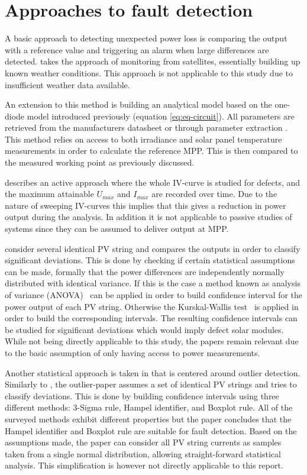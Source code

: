 \clearpage
\section{Approaches to fault detection}
A basic approach to detecting unexpected power loss is comparing the output with a reference value and triggering an alarm when large differences are detected.
\cite{Stettler2005} takes the approach of monitoring from satellites, essentially building up known weather conditions.
This approach is not applicable to this study due to insufficient weather data available.

An extension to this method is building an analytical model \cite{Chouder2010,Raina2013,Chao2008}
based on the one-diode model introduced previously (equation \ref{eq:eq-circuit}).
All parameters are retrieved from the manufacturers datasheet or through parameter extraction \cite{Eicker2005,Chouder2009,Walker2001}.
This method relies on access to both irradiance and solar panel temperature measurements in order to calculate the reference MPP.
This is then compared to the measured working point as previously discussed.

\cite{Meyer2004} describes an active approach where the whole IV-curve is studied for defects, and the maximum attainable $U_{max}$ and $I_{max}$ are recorded over time.
Due to the nature of sweeping IV-curves this implies that this gives a reduction in power output during the analysis.
In addition it is not applicable to passive studies of systems since they can be assumed to deliver output at MPP.

\cite{Vergura2008,Vergura2009} consider several identical PV string and compares the outputs in order to classify significant deviations.
This is done by checking if certain statistical assumptions can be made, formally that the power differences are independently normally distributed with identical variance.
If this is the case a method known as analysis of variance (ANOVA)~\cite{Vergura2009} can be applied in order to build confidence interval for the power output of each PV string.
Otherwise the Kurskal-Wallis test~\cite{Vergura2009} is applied in order to build the corresponding intervals.
The resulting confidence intervals can be studied for significant deviations which would imply defect solar modules.
While not being directly applicable to this study, the papers remain relevant due to the basic assumption of only having access to power measurements.

Another statistical approach is taken in \cite{Zhao2013outlier} that is centered around outlier detection.
Similarly to \cite{Vergura2008,Vergura2009}, the outlier-paper assumes a set of identical PV strings and tries to classify deviations.
This is done by building confidence intervals using three different methods: 3-Sigma rule, Hampel identifier, and Boxplot rule.
All of the surveyed methods exhibit different properties but the paper concludes that the Hampel identifier and Boxplot rule are suitable for fault detection.
Based on the assumptions made, the paper can consider all PV string currents as samples taken from a single normal distribution, allowing straight-forward statistical analysis.
This simplification is however not directly applicable to this report.

